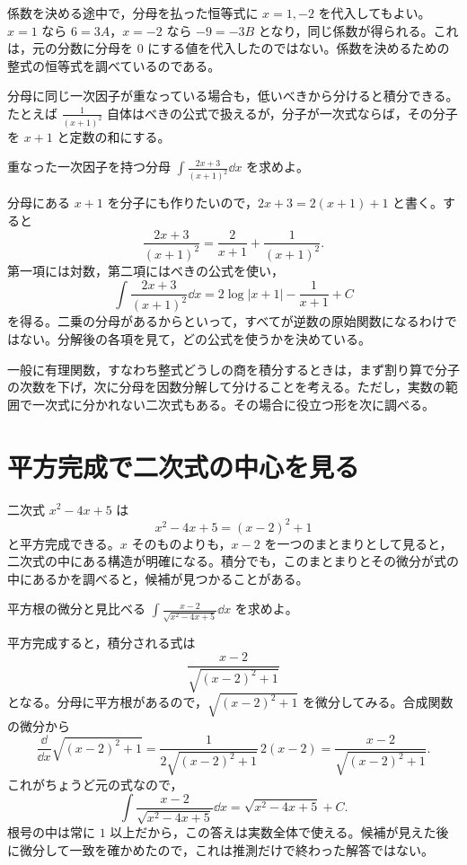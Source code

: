 係数を決める途中で，分母を払った恒等式に $x=1,-2$ を代入してもよい。$x=1$ なら $6=3A$，$x=-2$ なら $-9=-3B$ となり，同じ係数が得られる。これは，元の分数に分母を $0$ にする値を代入したのではない。係数を決めるための整式の恒等式を調べているのである。

分母に同じ一次因子が重なっている場合も，低いべきから分けると積分できる。たとえば $\frac1{(x+1)^2}$ 自体はべきの公式で扱えるが，分子が一次式ならば，その分子を $x+1$ と定数の和にする。

\begin{example}{重なった一次因子を持つ分母}
$\int\frac{2x+3}{(x+1)^2}\dd x$ を求めよ。
\end{example}

分母にある $x+1$ を分子にも作りたいので，$2x+3=2(x+1)+1$ と書く。すると
\[
 \frac{2x+3}{(x+1)^2}
 =\frac2{x+1}+\frac1{(x+1)^2}.
\]
第一項には対数，第二項にはべきの公式を使い，
\[
 \int\frac{2x+3}{(x+1)^2}\dd x
 =2\log|x+1|-\frac1{x+1}+C
\]
を得る。二乗の分母があるからといって，すべてが逆数の原始関数になるわけではない。分解後の各項を見て，どの公式を使うかを決めている。

一般に有理関数，すなわち整式どうしの商を積分するときは，まず割り算で分子の次数を下げ，次に分母を因数分解して分けることを考える。ただし，実数の範囲で一次式に分かれない二次式もある。その場合に役立つ形を次に調べる。

\section{平方完成で二次式の中心を見る}\label{節:平方完成と積分}

二次式 $x^2-4x+5$ は
\[
 x^2-4x+5=(x-2)^2+1
\]
と平方完成できる。$x$ そのものよりも，$x-2$ を一つのまとまりとして見ると，二次式の中にある構造が明確になる。積分でも，このまとまりとその微分が式の中にあるかを調べると，候補が見つかることがある。

\begin{example}{平方根の微分と見比べる}
$\int\frac{x-2}{\sqrt{x^2-4x+5}}\dd x$ を求めよ。
\end{example}

平方完成すると，積分される式は
\[
 \frac{x-2}{\sqrt{(x-2)^2+1}}
\]
となる。分母に平方根があるので，$\sqrt{(x-2)^2+1}$ を微分してみる。合成関数の微分から
\[
 \frac{\dd}{\dd x}\sqrt{(x-2)^2+1}
 =\frac1{2\sqrt{(x-2)^2+1}}\,2(x-2)
 =\frac{x-2}{\sqrt{(x-2)^2+1}}.
\]
これがちょうど元の式なので，
\[
 \int\frac{x-2}{\sqrt{x^2-4x+5}}\dd x
 =\sqrt{x^2-4x+5}+C.
\]
根号の中は常に $1$ 以上だから，この答えは実数全体で使える。候補が見えた後に微分して一致を確かめたので，これは推測だけで終わった解答ではない。

